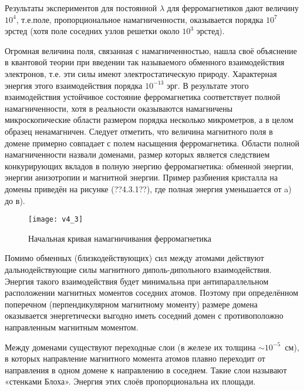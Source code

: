 Результаты экспериментов для постоянной $\lambda$ для ферромагнетиков дают величину $10^4$, т.е.поле, пропорциональное намагниченности, оказывается порядка $10^7$ эрстед (хотя поле соседних узлов решетки около $10^3$  эрстед).

Огромная величина поля, связанная с намагниченностью, нашла своё объяснение в квантовой теории при введении так называемого обменного взаимодействия электронов, т.е. эти силы имеют электростатическую природу. Характерная энергия этого взаимодействия порядка $10^{-13}$ эрг. В результате этого взаимодействия устойчивое состояние ферромагнетика соответствует полной намагниченности, хотя в реальности   оказываются намагничены микроскопические области размером порядка несколько микрометров, а в целом образец ненамагничен. Следует  отметить, что величина магнитного поля в домене примерно совпадает с полем насыщения ферромагнетика. Области полной намагниченности назвали доменами, размер которых является следствием конкурирующих вкладов в полную энергию ферромагнетика: обменной энергии, энергии анизотропии и магнитной энергии. Пример разбиения кристалла на домены приведён на рисунке (??4.3.1??), где полная энергия уменьшается от a) до в). 


\begin{wrapfigure}[]{r}{0.35\textwidth}
	\texttt{[image: v4\_3]}
	\caption{Начальная кривая намагничивания ферромагнетика}
\end{wrapfigure}

Помимо обменных (близкодействующих) сил между атомами действуют дальнодействующие силы магнитного диполь-дипольного взаимодействия. Энергия такого взаимодействия будет минимальна при антипараллельном расположении магнитных моментов соседних атомов. Поэтому при определённом поперечном (перпендикулярном магнитному моменту) размере домена оказывается энергетически выгодно иметь соседний домен с противоположно направленным магнитным моментом.

Между доменами существуют переходные слои (в железе их толщина $\sim 10^{-5}$~см), в которых направление магнитного момента атомов плавно переходит от направления в одном домене к направлению в соседнем. Такие слои называют «стенками Блоха». Энергия этих слоёв пропорциональна их площади.

